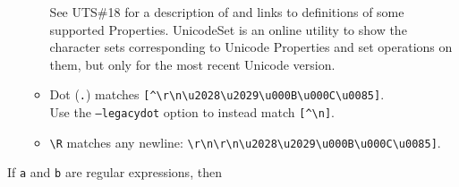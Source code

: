 \begin{itemize}
\begin{itemize}
    See UTS\#18 \autocite{unicode_rep} for a description of and links to
    definitions of some supported Properties. UnicodeSet
    \autocite{UnicodeSet} is an online utility to show the character
    sets corresponding to Unicode Properties and set operations on them,
    but only for the most recent Unicode version.
  \item
    Dot (\texttt{.}) matches
    \texttt{{[}\^{}\textbackslash{}r\textbackslash{}n\textbackslash{}u2028\textbackslash{}u2029\textbackslash{}u000B\textbackslash{}u000C\textbackslash{}u0085{]}}.\\Use
    the \texttt{–legacydot} option to instead match
    \texttt{{[}\^{}\textbackslash{}n{]}}.
  \item
    \texttt{\textbackslash{}R} matches any newline:
    \texttt{\textbackslash{}r\textbackslash{}n\textbar{}{[}\textbackslash{}r\textbackslash{}n\textbackslash{}u2028\textbackslash{}u2029\textbackslash{}u000B\textbackslash{}u000C\textbackslash{}u0085{]}}.
  \end{itemize}
\end{itemize}

If \texttt{a} and \texttt{b} are regular expressions, then

